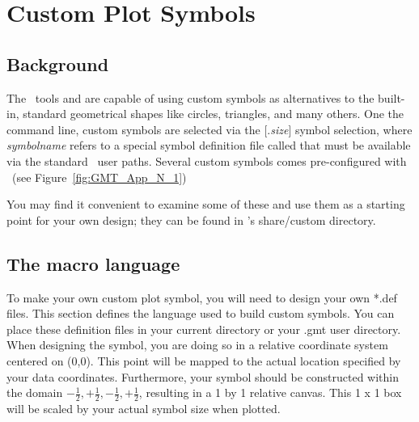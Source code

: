 %
%
\chapter{Custom Plot Symbols}
\label{app:N}
\thispagestyle{headings}

\section{Background}

The \GMT\ tools  and  are capable of using
custom symbols as alternatives to the built-in, standard geometrical shapes
like circles, triangles, and many others.  One the command line, custom
symbols are selected via the [.{\it size}] symbol
selection, where {\it symbolname} refers to a special symbol definition
file called  that must be available via the standard
\GMT\ user paths.  Several custom symbols comes pre-configured with \GMT\
(see Figure~\ref{fig:GMT_App_N_1})


You may find it convenient to examine some of these and use them as a starting
point for your own design; they can be found in \GMT's share/custom directory.


\section{The macro language}

To make your own custom plot symbol, you will need to design your own *.def files.
This section defines the language used to build custom symbols.  You can place these
definition files in your current directory or your .gmt user directory.  When designing
the symbol, you are doing so in a relative coordinate system centered on (0,0).  This point
will be mapped to the actual location specified by your data coordinates.  Furthermore,
your symbol should be constructed within the domain ${-\frac{1}{2},+\frac{1}{2},-\frac{1}{2},+\frac{1}{2}}$,
resulting in a 1 by 1 relative canvas.  This 1 x 1 box will be scaled by your actual
symbol size when plotted.

